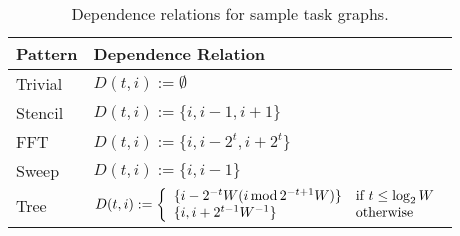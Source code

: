 \begin{table}[t]
\begin{tabular}{l | l}
Pattern & Dependence Relation \\
\hline


Trivial & $D(t, i) := \emptyset$ \\
Stencil & $D(t, i) := \{ i, i - 1, i + 1 \}$ \\
FFT & $D(t, i) := \{ i, i - 2^t, i + 2^t \}$ \\
Sweep & $D(t, i) := \{ i, i - 1 \}$ \\
Tree & $D(t, i) := \left\{ \begin{array}{l l} \{ i - 2^{-t}W(i \operatorname{mod} 2^{-t + 1}W) \} & \text{if } t \le \operatorname{log}_2 W \\ \{ i, i + 2^{t-1}W^{-1} \} & \text{otherwise} \end{array} \right.$ \\
\end{tabular}

\caption{Dependence relations for sample task graphs.\label{tab:equations}}
\end{table}
